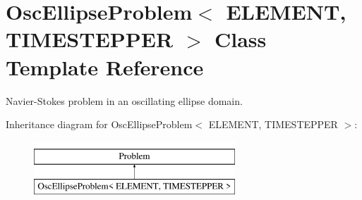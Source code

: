 \hypertarget{classOscEllipseProblem}{}\section{Osc\+Ellipse\+Problem$<$ E\+L\+E\+M\+E\+NT, T\+I\+M\+E\+S\+T\+E\+P\+P\+ER $>$ Class Template Reference}
\label{classOscEllipseProblem}


Navier-\/\+Stokes problem in an oscillating ellipse domain.  


Inheritance diagram for Osc\+Ellipse\+Problem$<$ E\+L\+E\+M\+E\+NT, T\+I\+M\+E\+S\+T\+E\+P\+P\+ER $>$\+:\begin{figure}[H]
\begin{center}
\leavevmode
\includegraphics[height=2.000000cm]{classOscEllipseProblem}
\end{center}
\end{figure}
